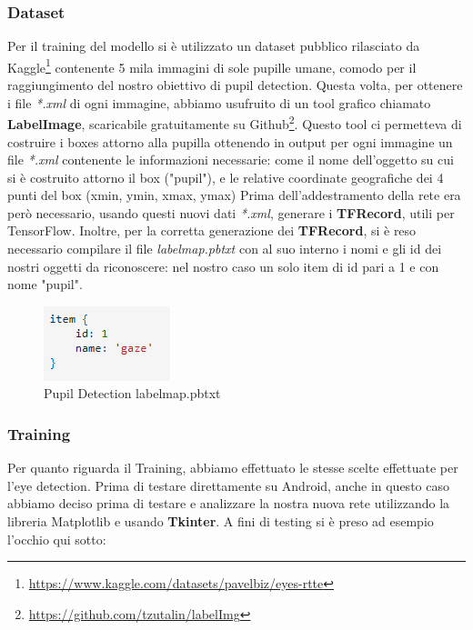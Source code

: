 \documentclass[11pt]{article}
\begin{document}
\subsubsection{Dataset}
Per il training del modello si è utilizzato un dataset pubblico rilasciato da Kaggle\footnote{\url{https://www.kaggle.com/datasets/pavelbiz/eyes-rtte}} contenente 5 mila immagini di sole pupille umane, comodo per il raggiungimento del nostro obiettivo di pupil detection.
\newline
Questa volta, per ottenere i file \textit{*.xml} di ogni immagine, abbiamo usufruito di un tool grafico chiamato \textbf{LabelImage}, scaricabile gratuitamente su Github\footnote{\url{https://github.com/tzutalin/labelImg}}. Questo tool ci permetteva di costruire i boxes attorno alla pupilla ottenendo in output per ogni immagine un file \textit{*.xml} contenente le informazioni necessarie: come il nome dell'oggetto su cui si è costruito attorno il box ("pupil"), e le relative coordinate geografiche dei 4 punti del box (xmin, ymin, xmax, ymax)
\newline \newline
Prima dell'addestramento della rete era però necessario, usando questi nuovi dati \textit{*.xml}, generare i \textbf{TFRecord}, utili per TensorFlow.
Inoltre, per la corretta generazione dei \textbf{TFRecord}, si è reso necessario compilare il file \textit{labelmap.pbtxt} con al suo interno i nomi e gli id dei nostri oggetti da riconoscere: nel nostro caso un solo item di id pari a 1 e con nome "pupil".

\begin{figure}[h]
\caption{Pupil Detection labelmap.pbtxt}
\centering
\includegraphics[scale=1]{img/item2.png}
\end{figure}

\subsubsection{Training}
Per quanto riguarda il Training, abbiamo effettuato le stesse scelte effettuate per l'eye detection.
\newline
Prima di testare direttamente su Android, anche in questo caso abbiamo deciso prima di testare e analizzare la nostra nuova rete utilizzando la libreria Matplotlib e usando \textbf{Tkinter}.
\newline
\newline
A fini di testing si è preso ad esempio l'occhio qui sotto:
\end{document}
